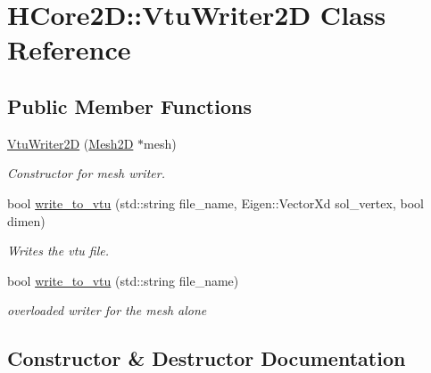 \hypertarget{classHCore2D_1_1VtuWriter2D}{}\section{H\+Core2D\+:\+:Vtu\+Writer2D Class Reference}
\label{classHCore2D_1_1VtuWriter2D}
\subsection*{Public Member Functions}
\begin{DoxyCompactItemize}
\item 
\hyperlink{classHCore2D_1_1VtuWriter2D_a30e274ce0dc037bff8720149b4c012f3}{Vtu\+Writer2D} (\hyperlink{classHCore2D_1_1Mesh2D}{Mesh2D} $\ast$mesh)
\begin{DoxyCompactList}\small\item\em Constructor for mesh writer. \end{DoxyCompactList}\item 
bool \hyperlink{classHCore2D_1_1VtuWriter2D_a3004c510461c2978278e781c8edec951}{write\+\_\+to\+\_\+vtu} (std\+::string file\+\_\+name, Eigen\+::\+Vector\+Xd sol\+\_\+vertex, bool dimen)
\begin{DoxyCompactList}\small\item\em Writes the vtu file. \end{DoxyCompactList}\item 
\mbox{\label{classHCore2D_1_1VtuWriter2D_a5c3d3a2fc48b70a5ab1d3a4af207dc7e}} 
bool \hyperlink{classHCore2D_1_1VtuWriter2D_a5c3d3a2fc48b70a5ab1d3a4af207dc7e}{write\+\_\+to\+\_\+vtu} (std\+::string file\+\_\+name)
\begin{DoxyCompactList}\small\item\em overloaded writer for the mesh alone \end{DoxyCompactList}\end{DoxyCompactItemize}


\subsection{Constructor \& Destructor Documentation}
\mbox{\label{classHCore2D_1_1VtuWriter2D_a30e274ce0dc037bff8720149b4c012f3}} 
